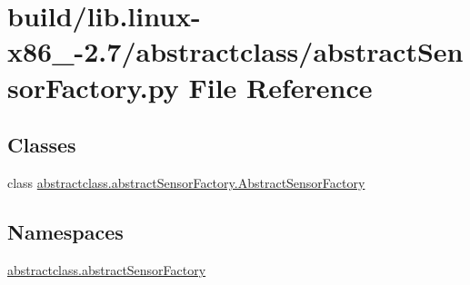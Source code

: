 \hypertarget{build_2lib_8linux-x86__64-2_87_2abstractclass_2abstractSensorFactory_8py}{}\section{build/lib.linux-\/x86\+\_-\/2.7/abstractclass/abstract\+Sensor\+Factory.py File Reference}
\label{build_2lib_8linux-x86__64-2_87_2abstractclass_2abstractSensorFactory_8py}
\subsection*{Classes}
\begin{DoxyCompactItemize}
\item 
class \hyperlink{classabstractclass_1_1abstractSensorFactory_1_1AbstractSensorFactory}{abstractclass.\+abstract\+Sensor\+Factory.\+Abstract\+Sensor\+Factory}
\end{DoxyCompactItemize}
\subsection*{Namespaces}
\begin{DoxyCompactItemize}
\item 
 \hyperlink{namespaceabstractclass_1_1abstractSensorFactory}{abstractclass.\+abstract\+Sensor\+Factory}
\end{DoxyCompactItemize}
